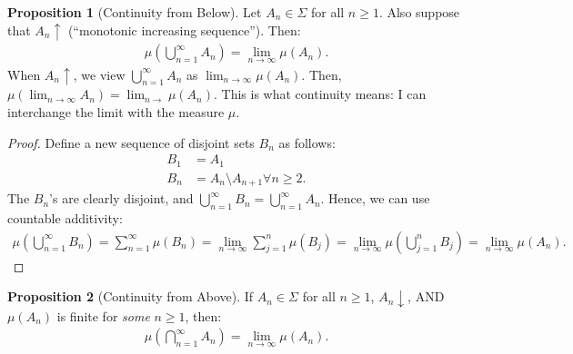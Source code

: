 \documentclass[11pt]{article}
\theoremstyle{definition}
\newtheorem{prop}{Proposition}[section]
\theoremstyle{theorem}
\begin{document}
\begin{prop}[Continuity from Below]
	Let \( A_n \in \Sigma \) for all \( n \geq 1 \). Also suppose that \( A_n \uparrow \) (``monotonic increasing sequence''). Then: 
	\begin{align}
		\mu \left( \bigcup_{n=1}^\infty A_n \right) = \lim_{n \rightarrow \infty} \mu (A_n).
	\end{align}
	When \( A_n \uparrow \), we view \( \bigcup_{n=1}^\infty A_n \) as \( \lim_{n \rightarrow \infty} \mu(A_n) \). Then, \( \mu ( \lim_{n \rightarrow \infty} A_n) = \lim_{n \rightarrow } \mu (A_n) \). This is what continuity means: I can interchange the limit with the measure \( \mu \).
\end{prop}
\begin{proof}
	Define a new sequence of disjoint sets \( B_n \) as follows:
	\begin{align*}
		B_1 & = A_1 \\
		B_n & = A_n \setminus A_{n+1} \forall n \geq 2. 
	\end{align*}
	The \( B_n \)'s are clearly disjoint, and \( \bigcup_{n=1}^\infty B_n =  \bigcup_{n=1}^\infty A_n \). Hence, we can use countable additivity:
	\begin{align*}
		\mu \left( \bigcup_{n=1}^\infty B_n \right)	= \sum_{n=1}^\infty \mu (B_n ) = \lim_{n \rightarrow \infty} \sum_{j=1}^n \mu (B_j) = \lim_{n \rightarrow \infty} \mu \left( \bigcup_{j=1}^n B_j \right) = \lim_{n \rightarrow \infty } \mu (A_n).
 	\end{align*}
\end{proof}

\begin{prop}[Continuity from Above]
	If \( A_n \in \Sigma \) for all \( n \geq 1 \), \( A_n \downarrow \), AND \( \mu(A_n) \) is finite for \emph{some} \( n \geq 1 \), then:
	\begin{align}
		\mu \left( \bigcap_{n=1}^\infty A_n \right) = \lim_{n \rightarrow \infty} \mu(A_n).
	\end{align}
\end{prop}
\end{document}
